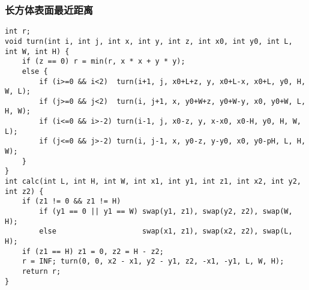 \documentclass[landscape,a4paper]{article}
\begin{document}
\begin{spacing}{0.3}
\begin{multicols}{2}
\subsubsection{长方体表面最近距离}
\begin{lstlisting}
int r;
void turn(int i, int j, int x, int y, int z, int x0, int y0, int L, int W, int H) {
	if (z == 0) r = min(r, x * x + y * y);
	else {
		if (i>=0 && i<2)  turn(i+1, j, x0+L+z, y, x0+L-x, x0+L, y0, H, W, L);
		if (j>=0 && j<2)  turn(i, j+1, x, y0+W+z, y0+W-y, x0, y0+W, L, H, W);
		if (i<=0 && i>-2) turn(i-1, j, x0-z, y, x-x0, x0-H, y0, H, W, L);
		if (j<=0 && j>-2) turn(i, j-1, x, y0-z, y-y0, x0, y0-pH, L, H, W);
	}
}
int calc(int L, int H, int W, int x1, int y1, int z1, int x2, int y2, int z2) {
	if (z1 != 0 && z1 != H)
		if (y1 == 0 || y1 == W) swap(y1, z1), swap(y2, z2), swap(W, H);
		else                    swap(x1, z1), swap(x2, z2), swap(L, H);
	if (z1 == H) z1 = 0, z2 = H - z2;
	r = INF; turn(0, 0, x2 - x1, y2 - y1, z2, -x1, -y1, L, W, H);
	return r;
}
\end{lstlisting}


\end{multicols}
\end{spacing}
\end{document}
